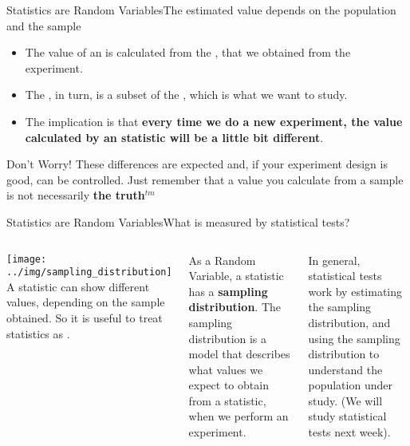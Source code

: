 \begin{frame}{Statistics are Random Variables}{The estimated value depends on the population and the sample}

  \begin{itemize}
    \item The value of an  is calculated from the , that we obtained from the experiment.
    \item The , in turn, is a subset of the , which is what we want to study.\bigskip

    \item The implication is that {\bf every time we do a new experiment, the value calculated by an statistic will be a little bit different}.
  \end{itemize}\vfill

  \begin{exampleblock}{Don't Worry!}
    These differences are expected and, if your experiment design is good, can be controlled. Just remember that a value you calculate from a sample is not necessarily {\bf the truth}$^{tm}$
  \end{exampleblock}


\end{frame}

\begin{frame}{Statistics are Random Variables}{What is measured by statistical tests?}
  \begin{columns}[T]
      \texttt{[image: ../img/sampling\_distribution]}
    A statistic can show different values, depending on the sample obtained.
    So it is useful to treat statistics as .\bigskip

    As a Random Variable, a statistic has a {\bf sampling distribution}.
    The sampling distribution is a model that describes what values we expect
    to obtain from a statistic, when we perform an experiment.\bigskip

    In general, statistical tests work by estimating the sampling distribution,
    and using the sampling distribution to understand the population under study.
    (We will study statistical tests next week).
  \end{columns}

\end{frame}





